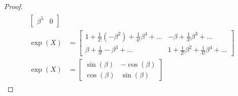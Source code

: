 \documentclass{book}
\begin{document}
\begin{proof}
\begin{align*}
\begin{split}
\begin{bmatrix}
        \beta^{5} & 0 
        \end{bmatrix} \\
        \exp(X) &= 
        \begin{bmatrix}
        1 + \frac{1}{2!}(-\beta^{2}) + \frac{1}{4!}\beta^{4} + ... & -\beta + \frac{1}{3!}\beta^{3} + ...\\
        \beta + \frac{1}{3!}-\beta^{3} + ... & 1 + \frac{1}{2!}\beta^{2} + \frac{1}{4!}\beta^{4} + ...
        \end{bmatrix} \\
        \exp(X) &=
        \begin{bmatrix}
        \sin(\beta) & -\cos(\beta)\\
        \cos(\beta) & \sin(\beta)
        \end{bmatrix}
     \end{split}
\end{align*}
\end{proof}
\pagebreak
\end{document}
